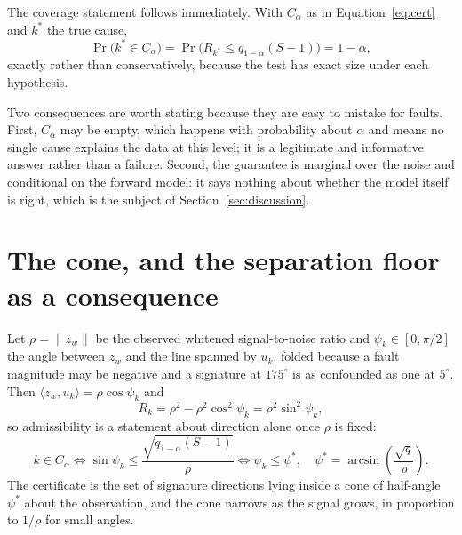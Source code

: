\documentclass[preprint,12pt]{elsarticle}
\begin{document}
The coverage statement follows immediately. With
$C_\alpha$ as in Equation~\eqref{eq:cert} and $k^\ast$ the true cause,
%
\begin{equation}
\Pr\bigl( k^\ast \in C_\alpha \bigr)
= \Pr\bigl( R_{k^\ast} \le q_{1-\alpha}(S-1) \bigr) = 1 - \alpha ,
\end{equation}
%
exactly rather than conservatively, because the test has exact size under each
hypothesis.

Two consequences are worth stating because they are easy to mistake for faults.
First, $C_\alpha$ may be empty, which happens with probability about $\alpha$
and means no single cause explains the data at this level; it is a legitimate
and informative answer rather than a failure. Second, the guarantee is marginal
over the noise and conditional on the forward model: it says nothing about
whether the model itself is right, which is the subject of
Section~\ref{sec:discussion}.


\section{The cone, and the separation floor as a consequence}
\label{app:cone}

Let $\rho = \lVert z_w \rVert$ be the observed whitened signal-to-noise ratio
and $\psi_k \in [0, \pi/2]$ the angle between $z_w$ and the line spanned by
$u_k$, folded because a fault magnitude may be negative and a signature at
$175^\circ$ is as confounded as one at $5^\circ$. Then
$\langle z_w, u_k \rangle = \rho \cos \psi_k$ and
%
\begin{equation}
R_k = \rho^2 - \rho^2 \cos^2 \psi_k = \rho^2 \sin^2 \psi_k ,
\end{equation}
%
so admissibility is a statement about direction alone once $\rho$ is fixed:
%
\begin{equation}
k \in C_\alpha
\iff
\sin \psi_k \le \frac{\sqrt{q_{1-\alpha}(S-1)}}{\rho}
\iff
\psi_k \le \psi^\ast, \quad
\psi^\ast = \arcsin\!\left(\frac{\sqrt{q}}{\rho}\right).
\end{equation}
%
The certificate is the set of signature directions lying inside a cone of
half-angle $\psi^\ast$ about the observation, and the cone narrows as the signal
grows, in proportion to $1/\rho$ for small angles.
\end{document}
